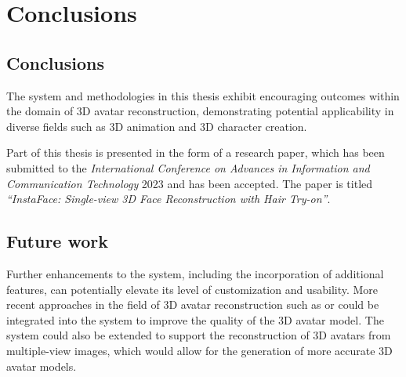 \section{Conclusions}\label{sec:conclusions}

\subsection{Conclusions}

The system and methodologies in this thesis exhibit encouraging outcomes within the domain of 3D avatar reconstruction, demonstrating potential applicability in diverse fields such as 3D animation and 3D character creation.

Part of this thesis is presented in the form of a research paper, which has been submitted to the \textit{International Conference on Advances in Information and Communication Technology} 2023 and has been accepted. The paper is titled \textit{``InstaFace: Single-view 3D Face Reconstruction with Hair Try-on''}. 

\subsection{Future work}

Further enhancements to the system, including the incorporation of additional features, can potentially elevate its level of customization and usability. More recent approaches in the field of 3D avatar reconstruction such as  or  could be integrated into the system to improve the quality of the 3D avatar model. The system could also be extended to support the reconstruction of 3D avatars from multiple-view images, which would allow for the generation of more accurate 3D avatar models.